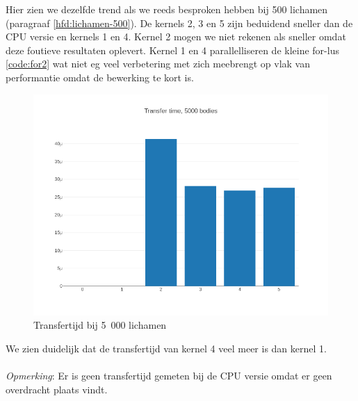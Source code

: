 \documentclass{article}
\begin{document}
Hier zien we dezelfde trend als we reeds besproken hebben bij 500 lichamen (paragraaf \ref{hfd:lichamen-500}).
De kernels 2, 3 en 5 zijn beduidend sneller dan de CPU versie en kernels 1 en 4. Kernel 2 mogen we niet rekenen als
sneller omdat deze foutieve resultaten oplevert. Kernel 1 en 4 parallelliseren de kleine for-lus \ref{code:for2}
wat niet eg veel verbetering met zich meebrengt op vlak van performantie omdat de bewerking te kort is.

\begin{figure}[H]
    \includegraphics[width=\linewidth]{./grafiekskes/hist_transfer5000.png}
    \caption{Transfertijd bij 5~000 lichamen}
\end{figure}


We zien duidelijk dat de transfertijd van kernel 4 veel meer is dan kernel 1.
\\
\\
\textit{Opmerking}: Er is geen transfertijd gemeten bij de CPU versie omdat er geen overdracht plaats vindt.
\end{document}
